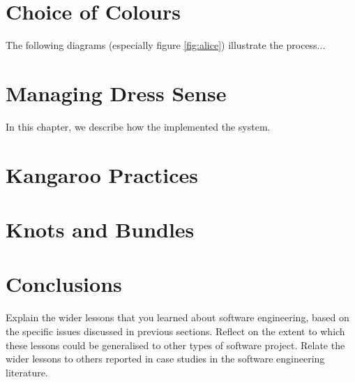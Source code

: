\documentclass{l3proj}
\begin{document}

\section{Choice of Colours}
\label{design}

The following diagrams (especially figure \ref{fig:alice}) illustrate the
process...

\section{Managing Dress Sense}
\label{managing}

In this chapter, we describe how the implemented the system.

\section{Kangaroo Practices}



\section{Knots and Bundles}
\label{sec:managing}


\section{Conclusions}

Explain the wider lessons that you learned about software engineering,
based on the specific issues discussed in previous sections.  Reflect
on the extent to which these lessons could be generalised to other
types of software project.  Relate the wider lessons to others
reported in case studies in the software engineering literature.



\end{document}
